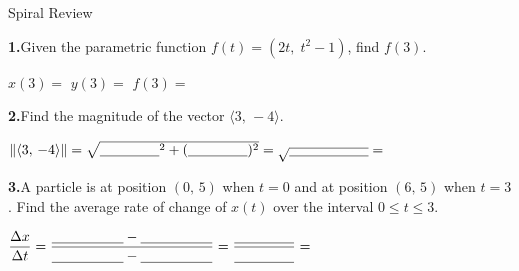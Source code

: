 \documentclass[10pt]{article}
\begin{document}
\namedateperiod

\vspace{0.12in}

\begin{notesbox}{Spiral Review}
\small

\textbf{1.}\quad Given the parametric function $f(t)=(2t,\;t^{2}-1)$, find $f(3)$.

\vspace{0.08in}
\hspace{1em} $x(3) = $ \blank{3cm} \qquad $y(3) = $ \blank{3cm}
\qquad $f(3) = $ \blank{3cm}

\vspace{0.22in}

\textbf{2.}\quad Find the magnitude of the vector $\langle 3,\,-4\rangle$.

\vspace{0.08in}
\hspace{1em} $\|\langle 3,\,-4\rangle\| = \sqrt{\blank{1.5cm}^{2}+(\blank{1.5cm})^{2}}
= \sqrt{\blank{2cm}} = $ \blank{2cm}

\vspace{0.22in}

\textbf{3.}\quad A particle is at position $(0,\,5)$ when $t=0$ and at position
$(6,\,5)$ when $t=3$.
Find the average rate of change of $x(t)$ over the interval $0\le t\le 3$.

\vspace{0.08in}
\hspace{1em} $\dfrac{\Delta x}{\Delta t} = \dfrac{\blank{1.8cm}-\blank{1.8cm}}{\blank{1.8cm}-\blank{1.8cm}}
= \dfrac{\blank{1.5cm}}{\blank{1.5cm}} = $ \blank{2cm}

\end{notesbox}
\end{document}
